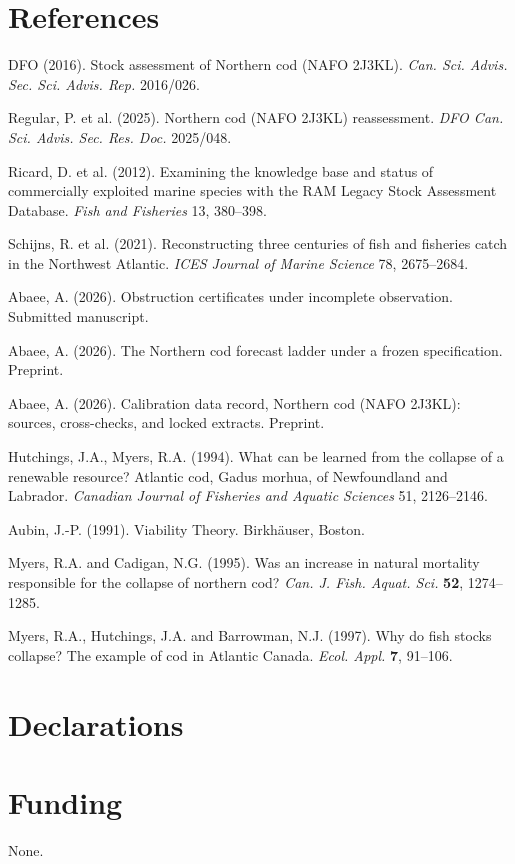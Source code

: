 \documentclass[10pt,twocolumn]{article}
\theoremstyle{plain}
\theoremstyle{remark}
\begin{document}
\section*{References}

{\footnotesize
DFO (2016). Stock assessment of Northern cod (NAFO 2J3KL). \emph{Can.
Sci. Advis. Sec. Sci. Advis. Rep.} 2016/026.

Regular, P. et al. (2025). Northern cod (NAFO 2J3KL) reassessment.
\emph{DFO Can. Sci. Advis. Sec. Res. Doc.} 2025/048.

Ricard, D. et al. (2012). Examining the knowledge base and status of
commercially exploited marine species with the RAM Legacy Stock
Assessment Database. \emph{Fish and Fisheries} 13, 380--398.

Schijns, R. et al. (2021). Reconstructing three centuries of fish and
fisheries catch in the Northwest Atlantic. \emph{ICES Journal of Marine
Science} 78, 2675--2684.

Abaee, A. (2026). Obstruction certificates under incomplete observation. Submitted manuscript.

Abaee, A. (2026). The Northern cod forecast ladder under a frozen
specification. Preprint.

Abaee, A. (2026). Calibration data record, Northern cod (NAFO 2J3KL):
sources, cross-checks, and locked extracts. Preprint.

Hutchings, J.A., Myers, R.A. (1994). What can be learned from the
collapse of a renewable resource? Atlantic cod, Gadus morhua, of
Newfoundland and Labrador. \emph{Canadian Journal of Fisheries and
Aquatic Sciences} 51, 2126--2146.

Aubin, J.-P. (1991). Viability Theory. Birkh\"auser, Boston.

Myers, R.A. and Cadigan, N.G. (1995). Was an increase in natural mortality responsible for
the collapse of northern cod? \emph{Can. J. Fish. Aquat. Sci.} \textbf{52}, 1274--1285.

Myers, R.A., Hutchings, J.A. and Barrowman, N.J. (1997). Why do fish stocks collapse? The
example of cod in Atlantic Canada. \emph{Ecol. Appl.} \textbf{7}, 91--106.
}

\section*{Declarations}

\section*{Funding}
None.
\end{document}
